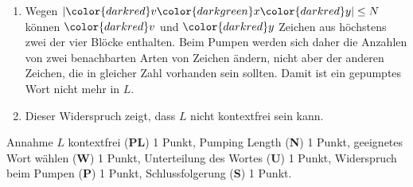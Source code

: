 \begin{loesung}
\begin{enumerate}
\begin{center}
\end{center}
Weitere Aufteilungen sind möglich, solange die roten Teile sich über nicht
mehr als $N$ Zeichen erstrecken.
\item
Wegen
$|{\color{darkred}v} {\color{darkgreen}x} {\color{darkred}y}| \le N$
können $\color{darkred}v$ und $\color{darkred}y$ Zeichen aus höchstens
zwei der vier Blöcke enthalten.
Beim Pumpen werden sich daher die Anzahlen von zwei benachbarten Arten
von Zeichen ändern, nicht aber der anderen Zeichen, die in gleicher
Zahl vorhanden sein sollten.
Damit ist ein gepumptes Wort nicht mehr in $L$.
\item
Dieser Widerspruch zeigt, dass $L$ nicht kontextfrei sein kann.
\qedhere
\end{enumerate}
\end{loesung}

\begin{bewertung}
Annahme $L$ kontextfrei ({\bf PL}) 1 Punkt,
Pumping Length ({\bf N}) 1 Punkt,
geeignetes Wort wählen ({\bf W}) 1 Punkt,
Unterteilung des Wortes ({\bf U}) 1 Punkt,
Widerspruch beim Pumpen ({\bf P}) 1 Punkt,
Schlussfolgerung ({\bf S}) 1 Punkt.
\end{bewertung}

